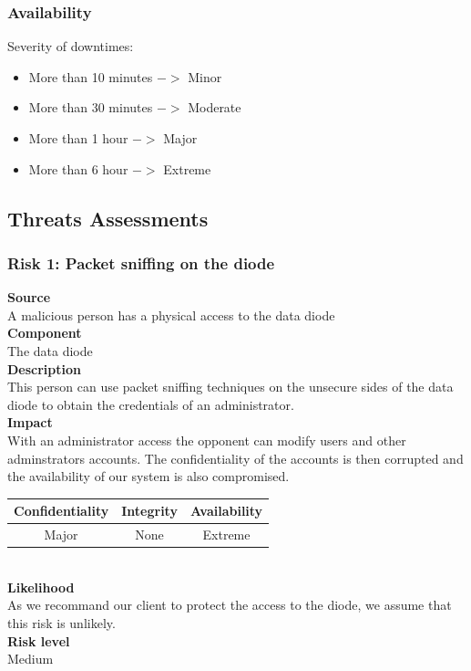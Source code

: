 \documentclass[a4paper,11pt]{article}
\begin{document}
\subsubsection{Availability}
Severity of downtimes:
\begin{itemize}
\item More than 10 minutes $->$ Minor
\item More than 30 minutes $->$ Moderate
\item More than 1 hour $->$ Major
\item More than 6 hour $->$ Extreme
\end{itemize}
\subsection{Threats Assessments}

\subsubsection{Risk 1: Packet sniffing on the diode }
\textbf{Source} \\A malicious person has a physical access to the data diode\\
\textbf{Component} \\The data diode\\
\textbf{Description}\\ This person can use packet sniffing techniques on the unsecure sides of the data diode to obtain the credentials of an administrator. \\
\textbf{Impact}\\
With an administrator access the opponent can modify users and other adminstrators accounts. The confidentiality of the accounts is then corrupted and the availability of our system is also compromised.\\
\begin{tabular}{|c|c|c|}
\hline
Confidentiality & Integrity & Availability \\
\hline
Major & None & Extreme \\
\hline
\end{tabular}\\
\textbf{Likelihood}\\ As we recommand our client to protect the access to the diode, we assume that this risk is unlikely.\\
\textbf{Risk level}\\Medium\\
\end{document}
